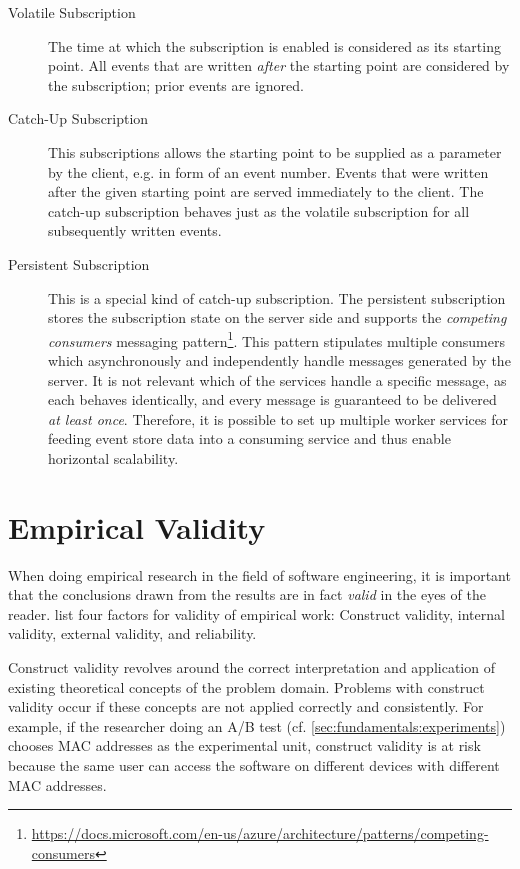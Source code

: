 \begin{description}
\item[Volatile Subscription]
The time at which the subscription is enabled is considered as its starting point.
All events that are written \emph{after} the starting point are considered by the subscription; prior events are ignored.
\item[Catch-Up Subscription]
This subscriptions allows the starting point to be supplied as a parameter by the client, e.g. in form of an event number.
Events that were written after the given starting point are served immediately to the client.
The catch-up subscription behaves just as the volatile subscription for all subsequently written events.
\item[Persistent Subscription] 
This is a special kind of catch-up subscription.
The persistent subscription stores the subscription state on the server side and supports the \emph{competing consumers} messaging pattern\footnote{\url{https://docs.microsoft.com/en-us/azure/architecture/patterns/competing-consumers}}.
This pattern stipulates multiple consumers which asynchronously and independently handle messages generated by the server.
It is not relevant which of the services handle a specific message, as each behaves identically, and every message is guaranteed to be delivered \emph{at least once}.
Therefore, it is possible to set up multiple worker services for feeding event store data into a consuming service and thus enable horizontal scalability.
\end{description}

\section{Empirical Validity}
\label{sec:fundamentals:evaluation}

When doing empirical research in the field of software engineering, it is important that the conclusions drawn from the results are in fact \emph{valid} in the eyes of the reader.
\citet{Easterbrook2008a} list four factors for validity of empirical work: Construct validity, internal validity, external validity, and reliability.

Construct validity revolves around the correct interpretation and application of existing theoretical concepts of the problem domain.
Problems with construct validity occur if these concepts are not applied correctly and consistently.
For example, if the researcher doing an A/B test (cf. \cref{sec:fundamentals:experiments}) chooses MAC addresses as the experimental unit, construct validity is at risk because the same user can access the software on different devices with different MAC addresses.

